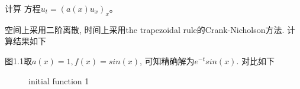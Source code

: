 计算 方程$u_t = (a(x) u_x)_x$。

空间上采用二阶离散, 时间上采用the trapezoidal rule的Crank-Nicholson方法.
计算结果如下


图1.1取$a(x) = 1, f(x) = sin(x)$, 可知精确解为$e^{-t} sin(x)$. 对比如下
\begin{figure}[!htbp]
  \caption{initial function 1}
  \centering
\end{figure}

